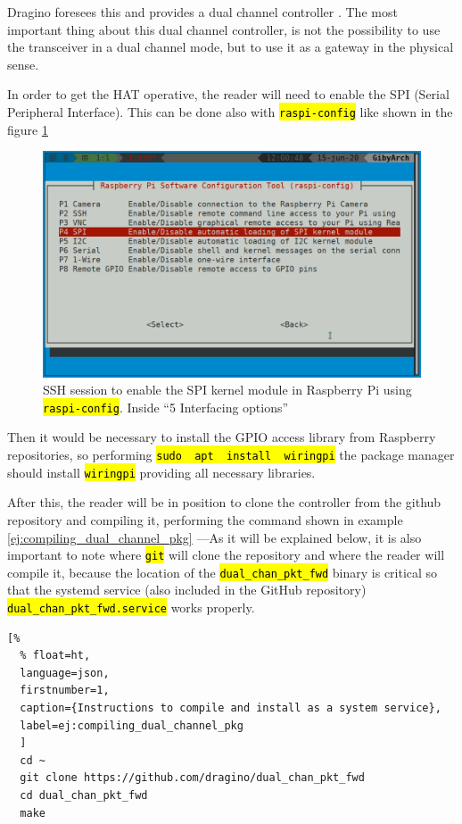 \documentclass[11pt,a4paper,dvipsnames,twoside]{article}
\newcommand{\cmd}[1] {\hl{\texttt{#1}}}
\begin{document}
Dragino foresees this and provides a dual channel controller \cite{Dragino_DualChannelController_Rpi}. The most important thing about this dual channel controller, is not the possibility to use the transceiver in a dual channel mode, but to use it as a gateway in the physical sense.

In order to get the HAT operative, the reader will need to enable the SPI (Serial Peripheral Interface). This can be done also with \cmd{raspi-config} like shown in the figure \ref{fig:EnablingSPI} 

\begin{figure}[ht]
  \centering
  \includegraphics[width=.9\textwidth]{../pictures/SPI_raspi-config.png}
  \caption{SSH session to enable the SPI kernel module in Raspberry Pi using \cmd{raspi-config}. Inside \enquote{5 Interfacing options}}
  \label{fig:EnablingSPI}
\end{figure}

Then it would be necessary to install the GPIO access library from Raspberry repositories, so performing \cmd{sudo\, apt\, install\, wiringpi} the package manager should install \cmd{wiringpi} providing all necessary libraries.

After this, the reader will be in position to clone the controller from the github repository \cite{Dragino_DualChannelController_Rpi} and compiling it, performing the command shown in example \ref{ej:compiling_dual_channel_pkg} ---As it will be explained below, it is also important to note where \cmd{git} will clone the repository and where the reader will compile it, because the location of the \cmd{dual\_chan\_pkt\_fwd} binary is critical so that the systemd service (also included in the GitHub repository) \cmd{dual\_chan\_pkt\_fwd.service} works properly.
 
\begin{lstlisting}[%
  % float=ht,
  language=json,
  firstnumber=1,
  caption={Instructions to compile and install as a system service},
  label=ej:compiling_dual_channel_pkg
  ]
  cd ~
  git clone https://github.com/dragino/dual_chan_pkt_fwd
  cd dual_chan_pkt_fwd
  make
\end{lstlisting}
\end{document}
